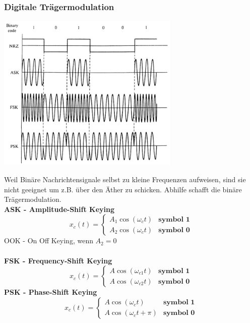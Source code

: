
\subsubsection{Digitale Trägermodulation }
\begin{minipage}{9cm}
	\includegraphics[width=8.7cm]{bilder/dig_traegermodulation.png}
\end{minipage}
\begin{minipage}{9cm}
	Weil Binäre Nachrichtensignale selbst zu kleine Frequenzen aufweisen, sind sie nicht geeignet um
	z.B. über den Äther zu schicken. Abhilfe schafft die binäre Trägermodulation. 
	\vspace{0.1cm}  \\
	\textbf{ASK - Amplitude-Shift Keying}
	\[x_c(t) = \begin{cases}
           A_1 \cos(\omega_c t) & \textbf{symbol 1} \\
           A_2 \cos(\omega_c t) & \textbf{symbol 0}
           \end{cases} \]
    OOK - On Off Keying, wenn $A_2 = 0$\\ \\
	\textbf{FSK - Frequency-Shift Keying}
	\[x_c(t) = \begin{cases}
           A \cos(\omega_{c1} t) & \textbf{symbol 1}     \\         
           A \cos(\omega_{c2} t) & \textbf{symbol 0}
           \end{cases} \]
	\textbf{PSK - Phase-Shift Keying} \\
	\[x_c(t) = \begin{cases}
           A \cos(\omega_{c} t) & \textbf{symbol 1}        \\      
           A \cos(\omega_{c} t + \pi) & \textbf{symbol 0}
           \end{cases}\] \\
\end{minipage}

